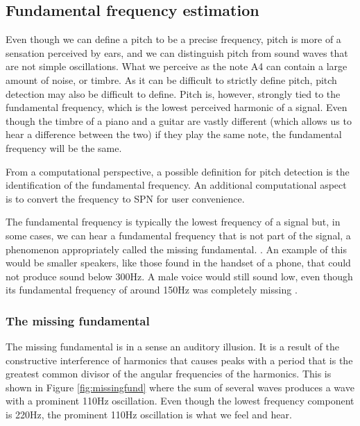 \subsection{Fundamental frequency estimation}
Even though we can define a pitch to be a precise frequency, pitch is more of a sensation perceived by ears, and we can distinguish pitch from sound waves that are not simple oscillations. What we perceive as the note A4 can contain a large amount of noise, or timbre. As it can be difficult to strictly define pitch, pitch detection may also be difficult to define. Pitch is, however, strongly tied to the fundamental frequency, which is the lowest perceived harmonic of a signal. Even though the timbre of a piano and a guitar are vastly different (which allows us to hear a difference between the two) if they play the same note, the fundamental frequency will be the same. 

From a computational perspective, a possible definition for pitch detection is the identification of the fundamental frequency. An additional computational aspect is to convert the frequency to SPN for user convenience. 

The fundamental frequency is typically the lowest frequency of a signal but, in some cases, we can hear a fundamental frequency that is not part of the signal, a phenomenon appropriately called the missing fundamental. \cite{Gotsopoulos}. An example of this would be smaller speakers, like those found in the handset of a phone, that could not produce sound below 300Hz. A male voice would still sound low, even though its fundamental frequency of around 150Hz was completely missing \cite{Mather2009}.

\subsubsection{The missing fundamental}
The missing fundamental is in a sense an auditory illusion. It is a result of the constructive interference of harmonics that causes peaks with a period that is the greatest common divisor of the angular frequencies of the harmonics. This is shown in Figure \ref{fig:missingfund} where the sum of several waves produces a wave with a prominent 110Hz oscillation. Even though the lowest frequency component is 220Hz, the prominent 110Hz oscillation is what we feel and hear.

